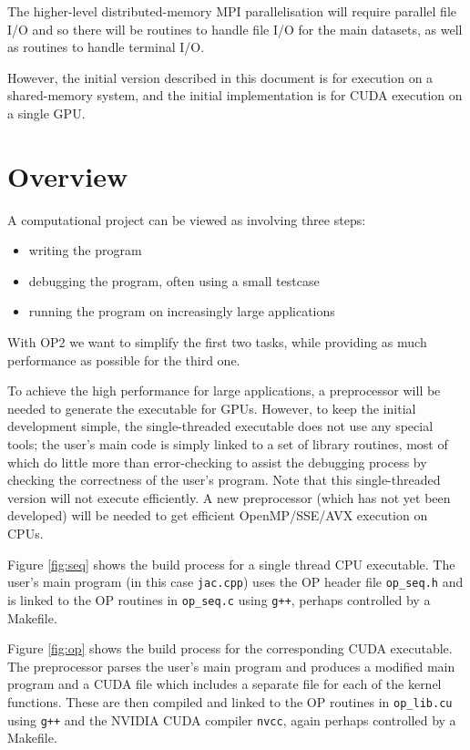 \documentclass[11pt]{article}
\begin{document}
The higher-level distributed-memory MPI parallelisation will 
require parallel file I/O and so there will be routines to handle 
file I/O for the main datasets, as well as routines to handle 
terminal I/O.

However, the initial version described in this document is for 
execution on a shared-memory system, and the initial implementation
is for CUDA execution on a single GPU.

\newpage
\section{Overview}

A computational project can be viewed as involving three steps:
\begin{itemize}
\item
writing the program
\item
debugging the program, often using a small testcase
\item
running the program on increasingly large applications
\end{itemize}

With OP2 we want to simplify the first two tasks, while providing
as much performance as possible for the third one.  

To achieve the high performance for large applications, a 
preprocessor will be needed to generate the executable for GPUs.
However, to keep the initial development simple, the single-threaded 
executable does not use any special tools; the user's main code
is simply linked to a set of library routines, most of which do
little more than error-checking to assist the debugging process 
by checking the correctness of the user's program.  Note that this 
single-threaded version will not execute efficiently.  A new 
preprocessor (which has not yet been developed) will be needed 
to get efficient OpenMP/SSE/AVX execution on CPUs.

Figure \ref{fig:seq} shows the build process for a single 
thread CPU executable.  The user's main program (in this case 
{\tt jac.cpp}) uses the OP header file {\tt op\_seq.h} and is 
linked to the OP routines in {\tt op\_seq.c} using {\tt g++},
perhaps controlled by a Makefile.

Figure \ref{fig:op} shows the build process for the corresponding
CUDA executable.  The preprocessor parses the user's main program 
and produces a modified main program and a CUDA file which
includes a separate file for each of the kernel functions.  These 
are then compiled and linked to the OP routines in {\tt op\_lib.cu} 
using {\tt g++} and the NVIDIA CUDA compiler {\tt nvcc}, again 
perhaps controlled by a Makefile.
\end{document}
